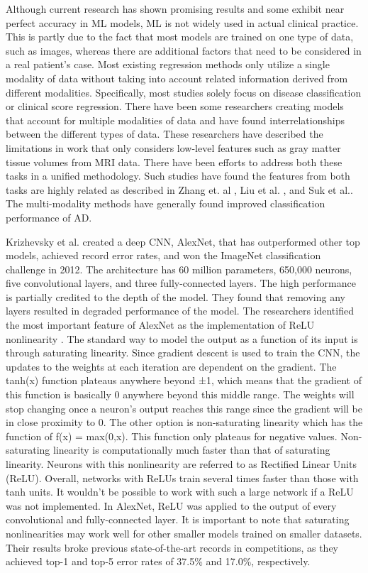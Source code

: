 \documentclass[10pt,twocolumn]{article}
\begin{document}
Although current research has shown promising results and some exhibit near perfect accuracy in ML models, ML is not widely used in actual clinical practice. This is partly due to the fact that most models are trained on one type of data, such as images, whereas there are additional factors that need to be considered in a real patient’s case. Most existing regression methods only utilize a single modality of data without taking into account related information derived from different modalities. Specifically, most studies solely focus on disease classification or clinical score regression. There have been some researchers creating models that account for multiple modalities of data and have found interrelationships between the different types of data. These researchers have described the limitations in work that only considers low-level features such as gray matter tissue volumes from MRI data. There have been efforts to address both these tasks in a unified methodology. Such studies have found the features from both tasks are highly related as described in Zhang et. al \cite{zhang2014classification}, Liu et al. \cite{liu2018joint}, and Suk et al.\cite{suk2013deep}. The multi-modality methods have generally found improved classification performance of AD. 

Krizhevsky et al.\cite{krizhevsky2012imagenet} 
created a deep CNN, AlexNet, that has outperformed other top models, achieved record error rates, and won the ImageNet classification challenge in 2012. The architecture has 60 million parameters,  650,000 neurons, five convolutional layers, and three fully-connected layers. The high performance is partially credited to the depth of the model. They found that removing any layers resulted in degraded performance of the model. The researchers identified the most important feature of AlexNet as the implementation of ReLU nonlinearity \cite{krizhevsky2012imagenet} . The standard way to model the output as a function of its input is through saturating linearity. Since gradient descent is used to train the CNN, the updates to the weights at each iteration are dependent on the gradient. The tanh(x) function plateaus anywhere beyond ±1, which means that the gradient of this function is basically 0 anywhere beyond this middle range. The weights will stop changing once a neuron’s output reaches this range since the gradient will be in close proximity to 0. The other option is non-saturating linearity which has the function of f(x) = max(0,x). This function only plateaus for negative values. Non-saturating linearity is computationally much faster than that of saturating linearity. Neurons with this nonlinearity are referred to as Rectified Linear Units (ReLU). Overall, networks with ReLUs train several times faster than those with tanh units. It wouldn’t be possible to work with such a large network if a ReLU was not implemented. In AlexNet, ReLU was applied to the output of every convolutional and fully-connected layer. It is important to note that saturating nonlinearities may work well for other smaller models trained on smaller datasets. Their results broke previous state-of-the-art records in competitions, as they achieved top-1 and top-5 error rates of 37.5\% and 17.0\%, respectively. 
\end{document}

